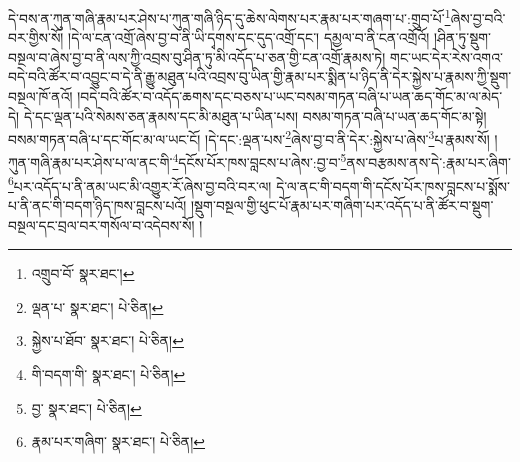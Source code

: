 དེ་བས་ན་ཀུན་གཞི་རྣམ་པར་ཤེས་པ་ཀུན་གཞི་ཉིད་དུ་ཆེས་ལེགས་པར་རྣམ་པར་གཞག་པ་:གྲུབ་པོ་\footnote{འགྲུབ་བོ་  སྣར་ཐང་། }ཞེས་བྱ་བའི་བར་གྱིས་སོ། །དེ་ལ་ངན་འགྲོ་ཞེས་བྱ་བ་ནི་ཡི་དྭགས་དང་དུད་འགྲོ་དང་། དམྱལ་བ་ནི་ངན་འགྲོའོ། །ཤིན་ཏུ་སྡུག་བསྔལ་བ་ཞེས་བྱ་བ་ནི་ལས་ཀྱི་འབྲས་བུ་ཤིན་ཏུ་མི་འདོད་པ་ཅན་གྱི་ངན་འགྲོ་རྣམས་ཏེ། གང་ཡང་དེར་རེས་འགའ་བདེ་བའི་ཚོར་བ་འབྱུང་བ་དེ་ནི་རྒྱུ་མཐུན་པའི་འབྲས་བུ་ཡིན་གྱི་རྣམ་པར་སྨིན་པ་ཉིད་ནི་དེར་སྐྱེས་པ་རྣམས་ཀྱི་སྡུག་བསྔལ་ཁོ་ནའོ། །བདེ་བའི་ཚོར་བ་འདོད་ཆགས་དང་བཅས་པ་ཡང་བསམ་གཏན་བཞི་པ་ཡན་ཆད་གོང་མ་ལ་མེད་དེ། དེ་དང་ལྡན་པའི་སེམས་ཅན་རྣམས་དང་མི་མཐུན་པ་ཡིན་པས། བསམ་གཏན་བཞི་པ་ཡན་ཆད་གོང་མ་སྟེ། བསམ་གཏན་བཞི་པ་དང་གོང་མ་ལ་ཡང་ངོ། །དེ་དང་:ལྡན་པས་\footnote{ལྡན་པ་  སྣར་ཐང་།  པེ་ཅིན། }ཞེས་བྱ་བ་ནི་དེར་:སྐྱེས་པ་ཞེས་\footnote{སྐྱེས་པ་ཐོབ་  སྣར་ཐང་།  པེ་ཅིན། }པ་རྣམས་སོ། །ཀུན་གཞི་རྣམ་པར་ཤེས་པ་ལ་ནང་གི་\footnote{གི་བདག་གི་  སྣར་ཐང་།  པེ་ཅིན། }དངོས་པོར་ཁས་བླངས་པ་ཞེས་:བྱ་བ་\footnote{བྱ་  སྣར་ཐང་།  པེ་ཅིན། }ནས་བརྩམས་ནས་དེ་:རྣམ་པར་ཞིག་\footnote{རྣམ་པར་གཞིག་  སྣར་ཐང་།  པེ་ཅིན། }པར་འདོད་པ་ནི་ནམ་ཡང་མི་འགྱུར་རོ་ཞེས་བྱ་བའི་བར་ལ། དེ་ལ་ནང་གི་བདག་གི་དངོས་པོར་ཁས་བླངས་པ་སྨོས་པ་ནི་ནང་གི་བདག་ཉིད་ཁས་བླངས་པའོ། །སྡུག་བསྔལ་གྱི་ཕུང་པོ་རྣམ་པར་གཞིག་པར་འདོད་པ་ནི་ཚོར་བ་སྡུག་བསྔལ་དང་བྲལ་བར་གསོལ་བ་འདེབས་སོ། །

